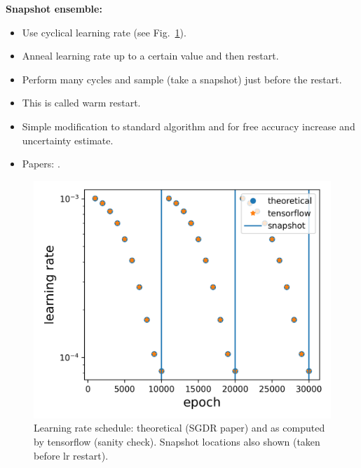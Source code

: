 \textbf{Snapshot ensemble:}
\begin{itemize}
	\item Use cyclical learning rate (see Fig.~\ref{fig:lr_sched}).
	\item Anneal learning rate up to a certain value and then restart.
	\item Perform many cycles and sample (take a snapshot) just before the restart.
	\item This is called warm restart.
	\item Simple modification to standard algorithm and for free accuracy increase and uncertainty estimate.
	\item Papers: \textcite{smith2017cyclical, huang2017snapshot,loshchilov2016sgdr, garipov2018loss}.
\end{itemize}

\begin{figure}[H]
	\centering
	\includegraphics[width=0.6\linewidth]{./figs/learning_schedule.png}  
	\caption{Learning rate schedule: theoretical (SGDR paper) and as computed by tensorflow (sanity check). Snapshot locations also shown (taken before lr restart).}
	\label{fig:lr_sched}
\end{figure}

\newpage
